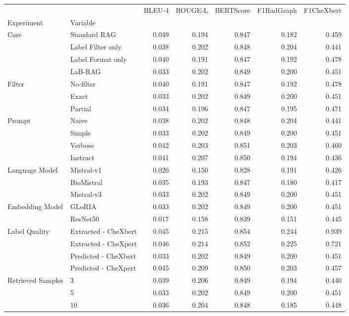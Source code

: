 \begin{tabular}{llrrrrr}
\toprule
 &  & BLEU-4 & ROUGE-L & BERTScore & F1RadGraph & F1CheXbert \\
Experiment & Variable &  &  &  &  &  \\
\midrule
\multirow[t]{4}{*}{Core} & Standard RAG & 0.049 & 0.194 & 0.847 & 0.182 & 0.459 \\
 & Label Filter only & 0.038 & 0.202 & 0.848 & 0.204 & 0.441 \\
 & Label Format only & 0.040 & 0.191 & 0.847 & 0.192 & 0.478 \\
 & LaB-RAG & 0.033 & 0.202 & 0.849 & 0.200 & 0.451 \\
\cline{1-7}
\multirow[t]{3}{*}{Filter} & No-filter & 0.040 & 0.191 & 0.847 & 0.192 & 0.478 \\
 & Exact & 0.033 & 0.202 & 0.849 & 0.200 & 0.451 \\
 & Partial & 0.034 & 0.196 & 0.847 & 0.195 & 0.471 \\
\cline{1-7}
\multirow[t]{4}{*}{Prompt} & Naive & 0.038 & 0.202 & 0.848 & 0.204 & 0.441 \\
 & Simple & 0.033 & 0.202 & 0.849 & 0.200 & 0.451 \\
 & Verbose & 0.042 & 0.203 & 0.851 & 0.203 & 0.460 \\
 & Instruct & 0.041 & 0.207 & 0.850 & 0.194 & 0.436 \\
\cline{1-7}
\multirow[t]{3}{*}{Language Model} & Mistral-v1 & 0.026 & 0.150 & 0.828 & 0.191 & 0.426 \\
 & BioMistral & 0.035 & 0.193 & 0.847 & 0.180 & 0.417 \\
 & Mistral-v3 & 0.033 & 0.202 & 0.849 & 0.200 & 0.451 \\
\cline{1-7}
\multirow[t]{2}{*}{Embedding Model} & GLoRIA & 0.033 & 0.202 & 0.849 & 0.200 & 0.451 \\
 & ResNet50 & 0.017 & 0.158 & 0.839 & 0.151 & 0.445 \\
\cline{1-7}
\multirow[t]{4}{*}{Label Quality} & Extracted - CheXbert & 0.045 & 0.215 & 0.854 & 0.244 & 0.939 \\
 & Extracted - CheXpert & 0.046 & 0.214 & 0.852 & 0.225 & 0.721 \\
 & Predicted - CheXbert & 0.033 & 0.202 & 0.849 & 0.200 & 0.451 \\
 & Predicted - CheXpert & 0.045 & 0.209 & 0.850 & 0.203 & 0.457 \\
\cline{1-7}
\multirow[t]{3}{*}{Retrieved Samples} & 3 & 0.039 & 0.206 & 0.849 & 0.194 & 0.440 \\
 & 5 & 0.033 & 0.202 & 0.849 & 0.200 & 0.451 \\
 & 10 & 0.036 & 0.204 & 0.848 & 0.185 & 0.448 \\
\cline{1-7}
\bottomrule
\end{tabular}
